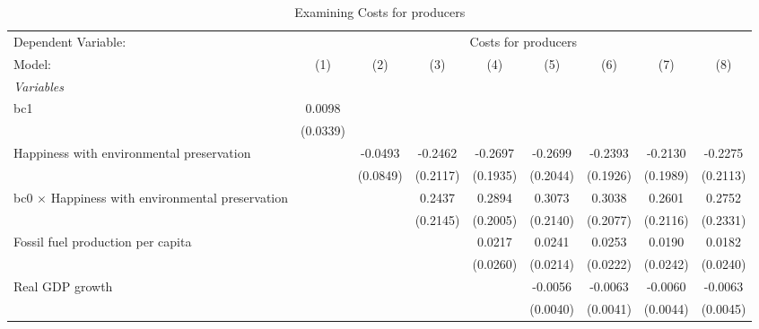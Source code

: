 
\begin{table}[htbp]
   \caption{Examining Costs for producers}
   \centering
   \begin{tabular}{lcccccccc}
      \tabularnewline \midrule \midrule
      Dependent Variable: & \multicolumn{8}{c}{Costs for producers}\\
      Model:                                                  & (1)      & (2)      & (3)      & (4)      & (5)      & (6)      & (7)            & (8)\\  
      \midrule
      \emph{Variables}\\
      bc1                                                     & 0.0098   &          &          &          &          &          &                &   \\   
                                                              & (0.0339) &          &          &          &          &          &                &   \\   
      Happiness with environmental preservation               &          & -0.0493  & -0.2462  & -0.2697  & -0.2699  & -0.2393  & -0.2130        & -0.2275\\   
                                                              &          & (0.0849) & (0.2117) & (0.1935) & (0.2044) & (0.1926) & (0.1989)       & (0.2113)\\   
      bc0 $\times$ Happiness with environmental preservation  &          &          & 0.2437   & 0.2894   & 0.3073   & 0.3038   & 0.2601         & 0.2752\\   
                                                              &          &          & (0.2145) & (0.2005) & (0.2140) & (0.2077) & (0.2116)       & (0.2331)\\   
      Fossil fuel production per capita                       &          &          &          & 0.0217   & 0.0241   & 0.0253   & 0.0190         & 0.0182\\   
                                                              &          &          &          & (0.0260) & (0.0214) & (0.0222) & (0.0242)       & (0.0240)\\   
      Real GDP growth                                         &          &          &          &          & -0.0056  & -0.0063  & -0.0060        & -0.0063\\   
                                                              &          &          &          &          & (0.0040) & (0.0041) & (0.0044)       & (0.0045)\\   

\end{tabular}
\end{table}
